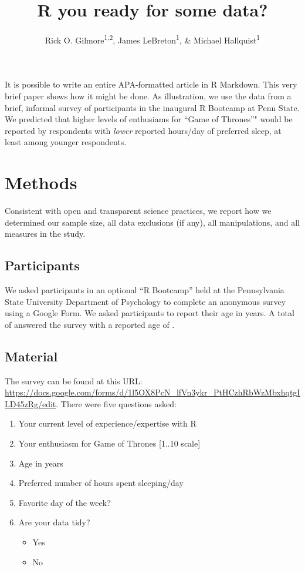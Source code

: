 \documentclass[english,man]{apa6}
\title{R you ready for some data?}
\author{Rick O. Gilmore\textsuperscript{1,2}, James LeBreton\textsuperscript{1}, \& Michael Hallquist\textsuperscript{1}}
\affiliation{
    \vspace{0.5cm}
          \textsuperscript{1} The Pennsylvania State University\\
          \textsuperscript{2} Databrary.org  }
\providecommand{\tightlist}{%
  \setlength{\itemsep}{0pt}\setlength{\parskip}{0pt}}
\theoremstyle{definition}
\theoremstyle{definition}
\theoremstyle{remark}
\begin{document}
\maketitle

\setcounter{secnumdepth}{0}



It is possible to write an entire APA-formatted article in R Markdown.
This very brief paper shows how it might be done. As illustration, we
use the data from a brief, informal survey of participants in the
inaugural R Bootcamp at Penn State. We predicted that higher levels of
enthusiams for \enquote{Game of Thrones}" would be reported by
respondents with \emph{lower} reported hours/day of preferred sleep, at
least among younger respondents.

\section{Methods}\label{methods}

Consistent with open and transparent science practices, we report how we
determined our sample size, all data exclusions (if any), all
manipulations, and all measures in the study.

\subsection{Participants}\label{participants}

We asked participants in an optional \enquote{R Bootcamp} held at the
Pennsylvania State University Department of Psychology to complete an
anonymous survey using a Google Form. We asked participants to report
their age in years. A total of answered the survey with a reported age
of .

\subsection{Material}\label{material}

The survey can be found at this URL:
\url{https://docs.google.com/forms/d/1l5OX8PcN_lfVn3ykr_PtHCzhRbWzMbxhqtgILD45zRg/edit}.
There were five questions asked:

\begin{enumerate}
\def\labelenumi{\arabic{enumi}.}
\tightlist
\item
  Your current level of experience/expertise with R
\item
  Your enthusiasm for Game of Thrones {[}1..10 scale{]}
\item
  Age in years
\item
  Preferred number of hours spent sleeping/day
\item
  Favorite day of the week?
\item
  Are your data tidy?

  \begin{itemize}
  \tightlist
  \item
    Yes
  \item
    No
  \end{itemize}
\end{enumerate}
\end{document}
